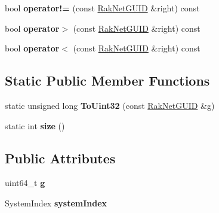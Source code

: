 \begin{DoxyCompactItemize}
\item 
\hypertarget{struct_rak_net_1_1_rak_net_g_u_i_d_ae34cce58ace6aee06a0f71bc250c7760}{bool {\bfseries operator!=} (const \hyperlink{struct_rak_net_1_1_rak_net_g_u_i_d}{Rak\-Net\-G\-U\-I\-D} \&right) const }\label{struct_rak_net_1_1_rak_net_g_u_i_d_ae34cce58ace6aee06a0f71bc250c7760}

\item 
\hypertarget{struct_rak_net_1_1_rak_net_g_u_i_d_add110da79db3e2763be386a5ee428210}{bool {\bfseries operator$>$} (const \hyperlink{struct_rak_net_1_1_rak_net_g_u_i_d}{Rak\-Net\-G\-U\-I\-D} \&right) const }\label{struct_rak_net_1_1_rak_net_g_u_i_d_add110da79db3e2763be386a5ee428210}

\item 
\hypertarget{struct_rak_net_1_1_rak_net_g_u_i_d_ae29bb14339fbd1816a77264cd6febafb}{bool {\bfseries operator$<$} (const \hyperlink{struct_rak_net_1_1_rak_net_g_u_i_d}{Rak\-Net\-G\-U\-I\-D} \&right) const }\label{struct_rak_net_1_1_rak_net_g_u_i_d_ae29bb14339fbd1816a77264cd6febafb}

\end{DoxyCompactItemize}
\subsection*{Static Public Member Functions}
\begin{DoxyCompactItemize}
\item 
\hypertarget{struct_rak_net_1_1_rak_net_g_u_i_d_ae0d22407760e8d7741656321e71f0476}{static unsigned long {\bfseries To\-Uint32} (const \hyperlink{struct_rak_net_1_1_rak_net_g_u_i_d}{Rak\-Net\-G\-U\-I\-D} \&g)}\label{struct_rak_net_1_1_rak_net_g_u_i_d_ae0d22407760e8d7741656321e71f0476}

\item 
\hypertarget{struct_rak_net_1_1_rak_net_g_u_i_d_a3d18a36312c48f4673970d5da9015303}{static int {\bfseries size} ()}\label{struct_rak_net_1_1_rak_net_g_u_i_d_a3d18a36312c48f4673970d5da9015303}

\end{DoxyCompactItemize}
\subsection*{Public Attributes}
\begin{DoxyCompactItemize}
\item 
\hypertarget{struct_rak_net_1_1_rak_net_g_u_i_d_a85ce33b0abd94e9609cc7390966ba93a}{uint64\-\_\-t {\bfseries g}}\label{struct_rak_net_1_1_rak_net_g_u_i_d_a85ce33b0abd94e9609cc7390966ba93a}

\item 
\hypertarget{struct_rak_net_1_1_rak_net_g_u_i_d_ae43edc6581fa1d27ce56dac2f20d5d2b}{System\-Index {\bfseries system\-Index}}\label{struct_rak_net_1_1_rak_net_g_u_i_d_ae43edc6581fa1d27ce56dac2f20d5d2b}

\end{DoxyCompactItemize}


